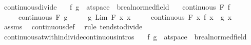 \begin{isabellebody}
{\isafoldproof}%
%
\isadelimproof
\isanewline
%
\endisadelimproof
\isanewline
{}\isamarkupfalse%
\ continuous{\isacharunderscore}{\kern0pt}divide{\isacharcolon}{\kern0pt}\isanewline
\ \ \ f\ g\ {\isacharcolon}{\kern0pt}{\isacharcolon}{\kern0pt}\ {\isachardoublequoteopen}{\isacharprime}{\kern0pt}a{\isacharcolon}{\kern0pt}{\isacharcolon}{\kern0pt}t{}{\isacharunderscore}{\kern0pt}space\ {\isasymRightarrow}\ {\isacharprime}{\kern0pt}b{\isacharcolon}{\kern0pt}{\isacharcolon}{\kern0pt}real{\isacharunderscore}{\kern0pt}normed{\isacharunderscore}{\kern0pt}field{\isachardoublequoteclose}\isanewline
\ \ \ {\isachardoublequoteopen}continuous\ F\ f{\isachardoublequoteclose}\isanewline
\ \ \ \ \ {\isachardoublequoteopen}continuous\ F\ g{\isachardoublequoteclose}\isanewline
\ \ \ \ \ {\isachardoublequoteopen}g\ {\isacharparenleft}{\kern0pt}Lim\ F\ {\isacharparenleft}{\kern0pt}{\isasymlambda}x{\isachardot}{\kern0pt}\ x{\isacharparenright}{\kern0pt}{\isacharparenright}{\kern0pt}\ {\isasymnoteq}\ {}{\isachardoublequoteclose}\isanewline
\ \ \ {\isachardoublequoteopen}continuous\ F\ {\isacharparenleft}{\kern0pt}{\isasymlambda}x{\isachardot}{\kern0pt}\ {\isacharparenleft}{\kern0pt}f\ x{\isacharparenright}{\kern0pt}\ {\isacharslash}{\kern0pt}\ {\isacharparenleft}{\kern0pt}g\ x{\isacharparenright}{\kern0pt}{\isacharparenright}{\kern0pt}{\isachardoublequoteclose}\isanewline
%
\isadelimproof
\ \ %
\endisadelimproof
%
\isatagproof
{}\isamarkupfalse%
\ assms\ \isamarkupfalse%
\ continuous{\isacharunderscore}{\kern0pt}def\ \isamarkupfalse%
\ {\isacharparenleft}{\kern0pt}rule\ tendsto{\isacharunderscore}{\kern0pt}divide{\isacharparenright}{\kern0pt}%
\endisatagproof
{\isafoldproof}%
%
\isadelimproof
\isanewline
%
\endisadelimproof
\isanewline
{}\isamarkupfalse%
\ continuous{\isacharunderscore}{\kern0pt}at{\isacharunderscore}{\kern0pt}within{\isacharunderscore}{\kern0pt}divide{\isacharbrackleft}{\kern0pt}continuous{\isacharunderscore}{\kern0pt}intros{\isacharbrackright}{\kern0pt}{\isacharcolon}{\kern0pt}\isanewline
\ \ \ f\ g\ {\isacharcolon}{\kern0pt}{\isacharcolon}{\kern0pt}\ {\isachardoublequoteopen}{\isacharprime}{\kern0pt}a{\isacharcolon}{\kern0pt}{\isacharcolon}{\kern0pt}t{}{\isacharunderscore}{\kern0pt}space\ {\isasymRightarrow}\ {\isacharprime}{\kern0pt}b{\isacharcolon}{\kern0pt}{\isacharcolon}{\kern0pt}real{\isacharunderscore}{\kern0pt}normed{\isacharunderscore}{\kern0pt}field{\isachardoublequoteclose}\isanewline

\end{isabellebody}
